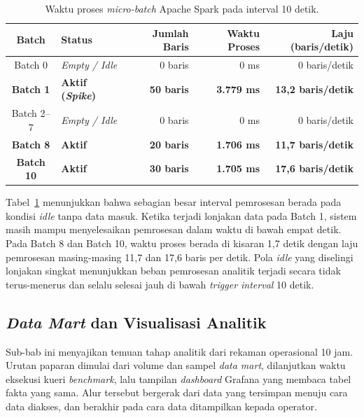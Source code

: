 \begin{table}[htbp]
\centering
\caption{Waktu proses \textit{micro-batch} Apache Spark pada interval 10 detik.}
\label{tab:spark-microbatch}
\small
\setlength{\tabcolsep}{4pt}
\begin{tabularx}{\textwidth}{c>{\RaggedRight\arraybackslash}Xrrr}
\toprule
\textbf{Batch} & \textbf{Status} & \textbf{Jumlah Baris} & \textbf{Waktu Proses} & \textbf{Laju (baris/detik)} \\
\midrule
Batch 0 & \textit{Empty / Idle} & 0 baris & 0 ms & 0 baris/detik \\
\textbf{Batch 1} & \textbf{Aktif (\textit{Spike})} & \textbf{50 baris} & \textbf{3.779 ms} & \textbf{13,2 baris/detik} \\
Batch 2--7 & \textit{Empty / Idle} & 0 baris & 0 ms & 0 baris/detik \\
\textbf{Batch 8} & \textbf{Aktif} & \textbf{20 baris} & \textbf{1.706 ms} & \textbf{11,7 baris/detik} \\
\textbf{Batch 10} & \textbf{Aktif} & \textbf{30 baris} & \textbf{1.705 ms} & \textbf{17,6 baris/detik} \\
\bottomrule
\end{tabularx}
\end{table}

Tabel~\ref{tab:spark-microbatch} menunjukkan bahwa sebagian besar interval pemrosesan berada pada kondisi \textit{idle} tanpa data masuk. Ketika terjadi lonjakan data pada Batch 1, sistem masih mampu menyelesaikan pemrosesan dalam waktu di bawah empat detik. Pada Batch 8 dan Batch 10, waktu proses berada di kisaran 1,7 detik dengan laju pemrosesan masing-masing 11,7 dan 17,6 baris per detik. Pola \textit{idle} yang diselingi lonjakan singkat menunjukkan beban pemrosesan analitik terjadi secara tidak terus-menerus dan selalu selesai jauh di bawah \textit{trigger interval} 10 detik.

\subsection{\textit{Data Mart} dan Visualisasi Analitik}
\label{subsec:hasil-datamart}


Sub-bab ini menyajikan temuan tahap analitik dari rekaman operasional 10 jam. Urutan paparan dimulai dari volume dan sampel \textit{data mart}, dilanjutkan waktu eksekusi kueri \textit{benchmark}, lalu tampilan \textit{dashboard} Grafana yang membaca tabel fakta yang sama. Alur tersebut bergerak dari data yang tersimpan menuju cara data diakses, dan berakhir pada cara data ditampilkan kepada operator.

